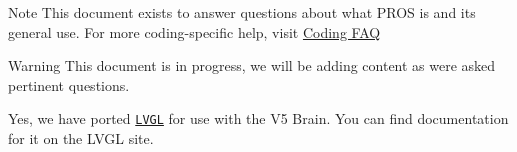 \begin{DoxyNote}{Note}
This document exists to answer questions about what P\+R\+OS is and its general use. For more coding-\/specific help, visit \hyperlink{coding-faq_8md}{Coding F\+AQ}
\end{DoxyNote}
\begin{DoxyWarning}{Warning}
This document is in progress, we will be adding content as we\textquotesingle{}re asked pertinent questions.
\end{DoxyWarning}


Yes, we have ported \href{https://littlevgl.com/}{\tt L\+V\+GL} for use with the V5 Brain. You can find documentation for it on the L\+V\+GL site. 